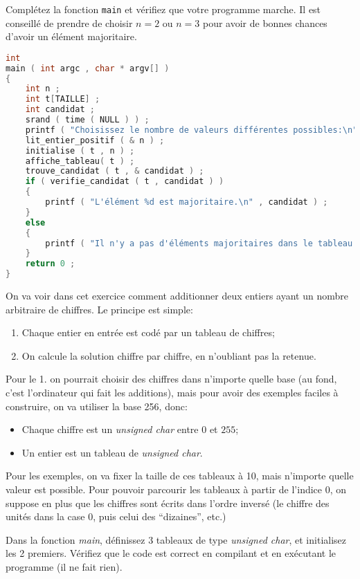 \question Complétez la fonction \texttt{main} et vérifiez que votre programme marche. Il est conseillé de prendre de choisir \(n=2\) ou \(n=3\) pour avoir de bonnes chances d'avoir un élément majoritaire.

\begin{solution}
  \begin{lstlisting}[language=C]
int 
main ( int argc , char * argv[] )
{
    int n ;
    int t[TAILLE] ;
    int candidat ;
    srand ( time ( NULL ) ) ;
    printf ( "Choisissez le nombre de valeurs différentes possibles:\n" ) ;
    lit_entier_positif ( & n ) ;
    initialise ( t , n ) ;
    affiche_tableau( t ) ;
    trouve_candidat ( t , & candidat ) ;
    if ( verifie_candidat ( t , candidat ) )
    {
        printf ( "L'élément %d est majoritaire.\n" , candidat ) ;
    }
    else
    {
        printf ( "Il n'y a pas d'éléments majoritaires dans le tableau.\n") ;
    }
    return 0 ;
}
  \end{lstlisting}
\end{solution}


On va voir dans cet exercice comment additionner deux entiers
ayant un nombre arbitraire de chiffres. Le principe est simple:
\begin{enumerate}
\item Chaque entier en entrée est codé par un tableau de chiffres;
\item On calcule la solution chiffre par chiffre, en n'oubliant pas 
  la retenue.
\end{enumerate}

Pour le 1. on pourrait choisir des chiffres dans n'importe quelle base
(au fond, c'est l'ordinateur qui fait les additions), mais pour avoir
des exemples faciles à construire, on va utiliser la base 256, donc:
\begin{itemize}
\item Chaque chiffre est un \emph{unsigned char} entre \(0\) et \(255\);
\item Un entier est un tableau de \emph{unsigned char}.
\end{itemize}
Pour les exemples, on va fixer la taille de ces tableaux à 10, mais
n'importe quelle valeur est possible. Pour pouvoir parcourir les
tableaux à partir de l'indice 0, on suppose en plus que les chiffres
sont écrits dans l'ordre inversé (le chiffre des unités dans la case
0, puis celui des ``dizaines'', etc.)

\question Dans la fonction \emph{main}, définissez 3 tableaux de type
\emph{unsigned char}, et initialisez les 2 premiers. Vérifiez que le
code est correct en compilant et en exécutant le programme (il ne fait
rien).
